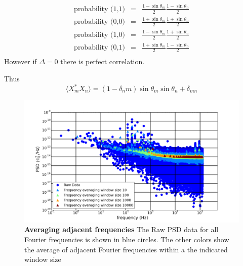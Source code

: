 \begin{eqnarray}
    \text{probability (1,1)}&=&\frac{1-\sin \theta_m}{2} \frac{1-\sin \theta_n}{2}\\
    \text{probability (0,0)}&=&\frac{1+\sin \theta_m}{2} \frac{1+\sin \theta_n}{2}\\
    \text{probability (1,0)}&=&\frac{1-\sin \theta_m}{2} \frac{1+\sin \theta_n}{2}\\
    \text{probability (0,1)}&=&\frac{1+\sin \theta_m}{2} \frac{1-\sin \theta_n}{2}\\
\end{eqnarray}
However if $\Delta=0$ there is perfect correlation.

Thus
\begin{equation}
\langle X^*_m X_n \rangle = (1 - \delta_nm) \sin{\theta_m} \sin{\theta_n} + \delta_{mn}
\end{equation}

\begin{figure}[h]
    \begin{center}
    \includegraphics[width=175mm]{./PDF/averaging_window_size_191001_336p.pdf}
    \end{center}
    \caption{\textbf{Averaging adjacent frequencies}
    The Raw PSD data for all Fourier frequencies is shown in blue circles.
    The other colors show the average of adjacent Fourier frequencies within a the indicated window size}
    \label{Averaging_window_size}
\end{figure}

